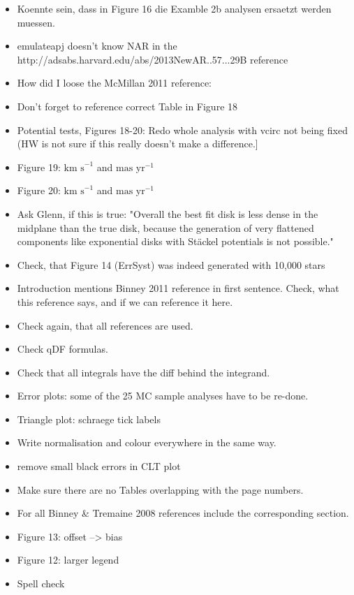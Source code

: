 \begin{itemize}
\item Koennte sein, dass in Figure 16 die Examble 2b analysen ersaetzt werden muessen.
\item emulateapj doesn't know NAR in the http://adsabs.harvard.edu/abs/2013NewAR..57...29B reference
\item How did I loose the McMillan 2011 reference: %
\item Don't forget to reference correct Table in Figure 18
\item Potential tests, Figures 18-20: Redo whole analysis with vcirc not being fixed (HW is not sure if this really doesn't make a difference.]
\item Figure 19: $\text{km s}^{-1}$ and $\text{mas yr}^{-1}$
\item Figure 20: $\text{km s}^{-1}$ and $\text{mas yr}^{-1}$
\item Ask Glenn, if this is true: "Overall the best fit disk is less dense in the midplane than the true disk, because the generation of very flattened components like exponential disks with St\"{a}ckel potentials is not possible."
\item Check, that Figure 14 (ErrSyst) was indeed generated with 10,000 stars
\item Introduction mentions Binney 2011 reference in first sentence. Check, what this reference says, and if we can reference it here.
\item Check again, that all references are used.
\item Check qDF formulas.
\item Check that all integrals have the diff behind the integrand.
\item Error plots: some of the 25 MC sample analyses have to be re-done.
\item Triangle plot: schraege tick labels
\item Write normalisation and colour everywhere in the same way.
\item remove small black errors in CLT plot
\item Make sure there are no Tables overlapping with the page numbers.
\item For all Binney \& Tremaine 2008 references include the corresponding section.
\item Figure 13: offset --> bias
\item Figure 12: larger legend
\item Spell check

\end{itemize}
